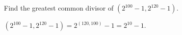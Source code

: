 \documentclass[../hw1]{subfiles}
\begin{document}
\begin{problem}[6]
Find the greatest common divisor of $(2^{100}-1,2^{120}-1)$.
\end{problem}
$(2^{100}-1,2^{120}-1)=2^{(120,100)}-1=2^{10}-1$.
\end{document}
